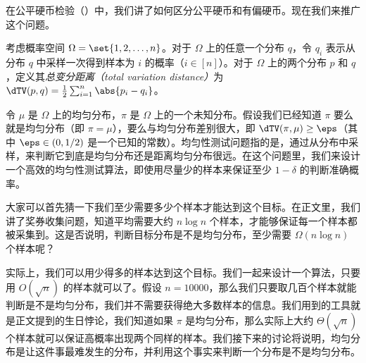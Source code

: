 \begin{problem} 在公平硬币检验（）中，我们讲了如何区分公平硬币和有偏硬币。现在我们来推广这个问题。

考虑概率空间 $\Omega = \set{1, 2, \dots, n}$。对于 $\Omega$ 上的任意一个分布 $q$，令 $q_i$ 表示从分布 $q$ 中采样一次得到样本为 $i$ 的概率（$i \in [n]$）。对于 $\Omega$ 上的两个分布 $p$ 和 $q$，定义其\emph{总变分距离（total variation distance）}为 $\dTV(p, q) = \frac{1}{2} \sum_{i=1}^n \abs{p_i - q_i}$。

令 $\mu$ 是 $\Omega$ 上的均匀分布，$\pi$ 是 $\Omega$ 上的一个未知分布。假设我们已经知道 $\pi$ 要么就是均匀分布（即 $\pi = \mu$），要么与均匀分布差别很大，即 $\dTV(\pi, \mu) \ge \eps$（其中 $\eps \in (0, 1/2)$ 是一个已知的常数）。均匀性测试问题指的是，通过从分布中采样，来判断它到底是均匀分布还是距离均匀分布很远。在这个问题里，我们来设计一个高效的均匀性测试算法，即使用尽量少的样本来保证至少 $1 - \delta$ 的判断准确概率。

大家可以首先猜一下我们至少需要多少个样本才能达到这个目标。在正文里，我们讲了奖券收集问题，知道平均需要大约 $n \log n$ 个样本，才能够保证每一个样本都被采集到。这是否说明，判断目标分布是不是均匀分布，至少需要 $\Omega(n \log n)$ 个样本呢？

实际上，我们可以用少得多的样本达到这个目标。我们一起来设计一个算法，只要用 $O(\sqrt{n})$ 的样本就可以了。假设 $n = 10000$，那么我们只要取几百个样本就能判断是不是均匀分布，我们并不需要获得绝大多数样本的信息。我们用到的工具就是正文提到的生日悖论，我们知道如果 $\pi$ 是均匀分布，那么实际上大约 $\Theta(\sqrt{n})$ 个样本就可以保证高概率出现两个同样的样本。我们接下来的讨论将说明，均匀分布是让这件事最难发生的分布，并利用这个事实来判断一个分布是不是均匀分布。


\end{problem}
